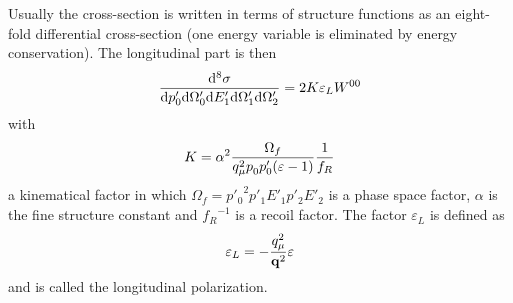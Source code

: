 Usually the cross-section is written in terms of  structure functions as
an eight-fold differential cross-section (one energy variable is eliminated 
by energy conservation). 
The longitudinal part is then
%
	\begin{equation}
		\frac{ {\rm d}^8 \sigma }
		{
			{\rm d} p'_0
			{\rm d} \Omega'_0
			{\rm d} E'_1
			{\rm d} \Omega'_1
			{\rm d} \Omega'_2
		}
	=
		2K\varepsilon_L W^{00}
	\end{equation}
%
with
%
	\begin{equation}
		K
	=
		\alpha^2
		\frac{ \Omega_f }
		{ q_\mu^2 p\phpr_0 p'_0 (\varepsilon -1) }
		\frac{1}{f_R}
	\end{equation}
%
a kinematical factor 
in which $\Omega_f={p'_0}^2 p'_1 E'_1 p'_2 E'_2$ is a phase space factor,
$\alpha$ is the fine structure constant  and
${f_R}^{-1}$ is a recoil factor.
The factor $\varepsilon_L$ is defined as
%
	\begin{equation}
		\varepsilon_L
	=
		-\frac{ q_\mu^2 }
		{ {\bf q}^2 }
		\varepsilon
	\end{equation}
%
and is called the longitudinal polarization.

